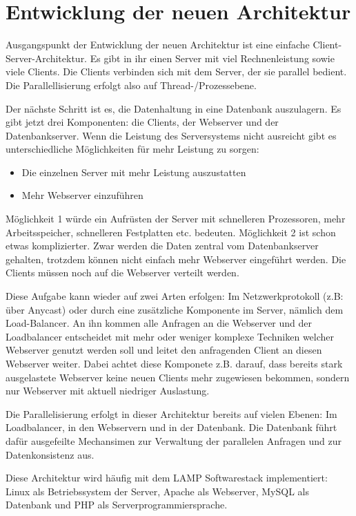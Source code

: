 \section{Entwicklung der neuen Architektur}
Ausgangspunkt der Entwicklung der neuen Architektur ist eine einfache Client-Server-Architektur. Es gibt in ihr einen Server
mit viel Rechnenleistung sowie viele Clients. Die Clients verbinden sich mit dem Server, der sie parallel bedient. Die Parallellisierung
erfolgt also auf Thread-/Prozessebene.

Der nächste Schritt ist es, die Datenhaltung in eine Datenbank auszulagern. Es gibt jetzt drei Komponenten: die Clients,
der Webserver und der Datenbankserver. Wenn die Leistung des Serversystems nicht ausreicht gibt es unterschiedliche Möglichkeiten
für mehr Leistung zu sorgen:
\begin{itemize}
  \item Die einzelnen Server mit mehr Leistung auszustatten
  \item Mehr Webserver einzuführen
\end{itemize}
Möglichkeit 1 würde ein Aufrüsten der Server mit schnelleren Prozessoren, mehr Arbeitsspeicher, schnelleren Festplatten etc.
bedeuten. Möglichkeit 2 ist schon etwas komplizierter. Zwar werden die Daten zentral vom Datenbankserver gehalten,
trotzdem können nicht einfach mehr Webserver eingeführt werden. Die Clients müssen noch auf die Webserver verteilt werden.

Diese Aufgabe kann wieder auf zwei Arten erfolgen: Im Netzwerkprotokoll (z.B: über Anycast) oder durch eine zusätzliche
Komponente im Server, nämlich dem Load-Balancer. An ihn kommen alle Anfragen an die Webserver und der Loadbalancer
entscheidet mit mehr oder weniger komplexe Techniken welcher Webserver genutzt werden soll und leitet
den anfragenden Client an diesen Webserver weiter. Dabei achtet diese Komponete z.B. darauf, dass bereits stark
ausgelastete Webserver keine neuen Clients mehr zugewiesen bekommen, sondern nur Webserver mit aktuell
niedriger Auslastung.

Die Parallelisierung erfolgt in dieser Architektur bereits auf vielen Ebenen: Im Loadbalancer, in den Webservern und in der
Datenbank. Die Datenbank führt dafür ausgefeilte Mechansimen zur Verwaltung der parallelen Anfragen und zur
Datenkonsistenz aus.

Diese Architektur wird häufig mit dem LAMP Softwarestack implementiert: Linux als Betriebssystem der Server,
Apache als Webserver, MySQL als Datenbank und PHP als Serverprogrammiersprache.

